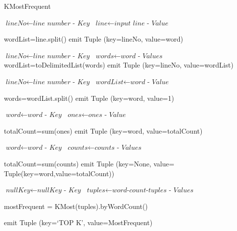 \documentclass[journal,10pt]{IEEEtran}
\begin{document}
\begin{algorithm}
\caption{KMostFrequent}\label{euclid}
\begin{algorithmic}[1]





\State $\textit{lineNo} \gets \textit{line number - Key} $
\State $\textit{line} \gets \textit{input line - Value }$



\State wordList=line.split()
\State emit Tuple (key=lineNo, value=word)
\EndIf
\EndFor
\EndProcedure


\State $\textit{lineNo} \gets \textit{line number - Key} $
\State $\textit{words} \gets \textit{word - Values}$
\State wordList=toDelimitedList(words)
\State emit Tuple (key=lineNo, value=wordList)
\EndProcedure

\State $\textit{lineNo} \gets \textit{line number - Key} $
\State $\textit{wordList} \gets \textit{word - Value}$

\State words=wordList.split()
\State emit Tuple (key=word, value=1)
\EndFor
\EndProcedure

\State $\textit{word} \gets \textit{word - Key} $
\State $\textit{ones} \gets \textit{ones - Value}$

\State totalCount=sum(ones)
\State emit Tuple (key=word, value=totalCount)
\EndProcedure


\State $\textit{word} \gets \textit{word - Key} $
\State $\textit{counts} \gets \textit{counts - Values}$

\State totalCount=sum(counts)
\State emit Tuple (key=None, value= Tuple(key=word,value=totalCount))
\EndProcedure






\State $\textit{nullKey} \gets \textit{nullKey - Key} $
\State $\textit{tuples} \gets \textit{word-count-tuples - Values}$

\State mostFrequent = KMost(tuples).byWordCount()

\State emit Tuple (key=`TOP K', value=MostFrequent)

\EndProcedure

\end{algorithmic}
\end{algorithm}
\clearpage
\end{document}
